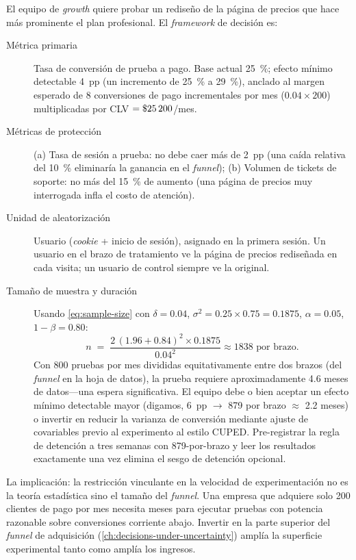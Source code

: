\begin{example}
El equipo de \emph{growth} quiere probar un rediseño de la página de precios que hace más
prominente el plan profesional. El \emph{framework} de decisión es:

\begin{description}
  \item[Métrica primaria] Tasa de conversión de prueba a pago. Base actual \qty{25}{\percent};
    efecto mínimo detectable \qty{4}{pp} (un incremento de \qty{25}{\percent} a
    \qty{29}{\percent}), anclado al margen esperado de \num{8} conversiones de pago
    incrementales por mes (\(0.04\times 200\)) multiplicadas por  CLV
    \(= \$\num{25200}\)/mes.
  \item[Métricas de protección] (a) Tasa de sesión a prueba: no debe caer más de \qty{2}{pp}
    (una caída relativa del \qty{10}{\percent} eliminaría la ganancia en el \emph{funnel});
    (b) Volumen de tickets de soporte: no más del \qty{15}{\percent} de aumento (una página
    de precios muy interrogada infla el costo de atención).
  \item[Unidad de aleatorización] Usuario (\emph{cookie} + inicio de sesión), asignado en
    la primera sesión. Un usuario en el brazo de tratamiento ve la página de precios
    rediseñada en cada visita; un usuario de control siempre ve la original.
  \item[Tamaño de muestra y duración] Usando \cref{eq:sample-size} con \(\delta=0.04\),
    \(\sigma^2=0.25\times 0.75=0.1875\), \(\alpha=0.05\), \(1-\beta=0.80\):
    \[
      n \;=\; \frac{2\,(1.96+0.84)^{2}\times 0.1875}{0.04^{2}} \approx \num{1838}
        \text{ por brazo.}
    \]
    Con \num{800} pruebas por mes divididas equitativamente entre dos brazos (del \emph{funnel}
    en la hoja de datos), la prueba requiere aproximadamente \num{4.6} meses de datos---una
    espera significativa. El equipo debe o bien aceptar un efecto mínimo detectable mayor
    (digamos, \qty{6}{pp} \(\to\) \num{879} por brazo \(\approx\) 2.2 meses) o invertir en
    reducir la varianza de conversión mediante ajuste de covariables previo al experimento al
    estilo CUPED. Pre-registrar la regla de detención a tres semanas con \num{879}-por-brazo
    y leer los resultados exactamente una vez elimina el sesgo de detención opcional.
\end{description}

La implicación: la restricción vinculante en la velocidad de experimentación no es la teoría
estadística sino el tamaño del \emph{funnel}. Una empresa que adquiere solo \num{200} clientes
de pago por mes necesita meses para ejecutar pruebas con potencia razonable sobre conversiones
corriente abajo. Invertir en la parte superior del \emph{funnel} de adquisición
(\cref{ch:decisions-under-uncertainty}) amplía la superficie experimental tanto como amplía
los ingresos.
\end{example}

